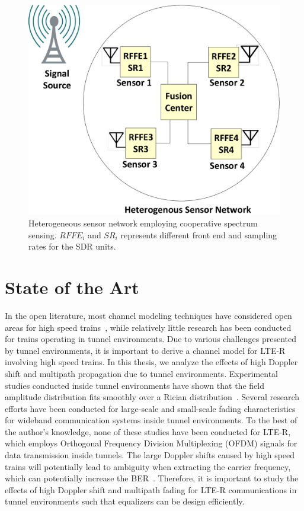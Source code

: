 \begin{figure}[!ht]
\centering
\includegraphics[width=\textwidth,keepaspectratio]{images/Gill/figs/introdiag.eps} 
\caption{Heterogeneous sensor network employing cooperative spectrum sensing. $RFFE_i$ and $SR_i$ represents different front end and sampling rates for the SDR units.}
\label{fig:css}
\end{figure}

\section{State of the Art}

In the open literature, most channel modeling techniques have considered open areas for high speed trains~\cite{inplter5,inplter6}, while relatively little research has been conducted for trains operating in tunnel environments. Due to various challenges presented by tunnel environments, it is important to derive a channel model for LTE-R involving high speed trains. In this thesis, we analyze the effects of high Doppler shift and multipath propagation due to tunnel environments. Experimental studies conducted inside tunnel environments have shown that the field amplitude distribution fits smoothly over a Rician distribution~\cite{inplter8}. Several research efforts have been conducted for large-scale and small-scale fading characteristics for wideband communication systems inside tunnel environments. To the best of the author’s knowledge, none of these studies have been conducted for LTE-R, which employs Orthogonal Frequency Division Multiplexing (OFDM) signals for data transmission inside tunnels. The large Doppler shifts caused by high speed trains will potentially lead to ambiguity when extracting the carrier frequency, which can potentially increase the BER~\cite{inplter9}. Therefore, it is important to study the effects of high Doppler shift and multipath fading for LTE-R communications in tunnel environments such that equalizers can be design efficiently.

